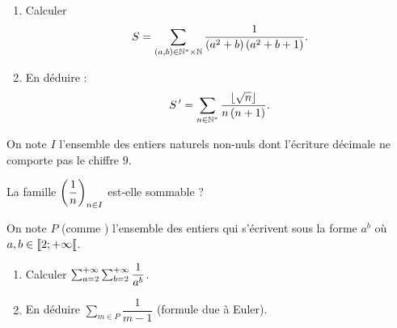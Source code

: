 \begin{exo}[Exercice 22]
\begin{enumerate}
\item Calculer \[S=\sum_{\left(a,b\right)\in\mathbb{N}^*\times\mathbb{N}}\dfrac{1}{\left(a^2+b\right)\left(a^2+b+1\right)}.\]

\item En déduire : \[S^{\,\prime}=\sum_{n\in\mathbb{N}^*}\dfrac{\left\lfloor\sqrt{n}\right\rfloor}{n\left(n+1\right)}.\]
\end{enumerate}
\end{exo}

\begin{corr}
\end{corr}

\begin{exo}[Exercice 23, X MP]
On note \(I\) l'ensemble des entiers naturels non-nuls dont l'écriture décimale ne comporte pas le chiffre \(9\).

La famille \(\left(\dfrac{1}{n}\right)_{n\in I}\) est-elle sommable ?
\end{exo}

\begin{corr}
\end{corr}

\begin{exo}[Exercice 24]
On note \(P\) (comme ) l'ensemble des entiers qui s'écrivent sous la forme \(a^b\) où \(a,b\in\left\llbracket2;+\infty\right\llbracket\).

\begin{enumerate}
\item Calculer \(\sum_{a=2}^{+\infty}\sum_{b=2}^{+\infty}\dfrac{1}{a^b}\). \\

\item En déduire \(\sum_{m\in P}\dfrac{1}{m-1}\) (formule due à Euler).
\end{enumerate}
\end{exo}

\begin{corr}
\end{corr}